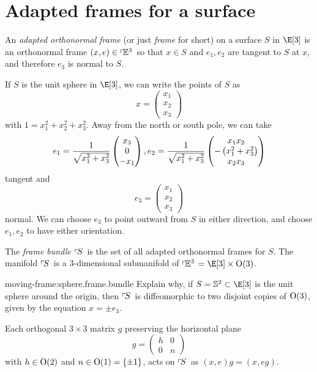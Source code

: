 \section{Adapted frames for a surface}
An \emph{adapted orthonormal frame}%
(or just \emph{frame} for short) on a surface \(S\) in \(\E[3]\) is an orthonormal frame \((x,e) \in \left\ulcorner\!\mathbb{E}^{3}\right.\) so that \(x \in S\) and \(e_1, e_2\) are tangent to \(S\) at \(x\), and therefore \(e_3\) is normal to \(S\).
\begin{example} 
If \(S\) is the unit sphere in \(\E[3]\), we can write the points of \(S\) as
\[
x
=
\begin{pmatrix}
x_1 \\
x_2 \\
x_3
\end{pmatrix}
\]
with \(1=x_1^2+x_2^2+x_3^2\).
Away from the north or south pole, we can take
\[
e_1
=
\frac{1}{\sqrt{x_1^2+x_3^2}}
\begin{pmatrix}
x_3 \\
0 \\
-x_1
\end{pmatrix},
e_2
=
\frac{1}{\sqrt{x_1^2+x_3^2}}
\begin{pmatrix}
x_1 x_2 \\
-\left(x_1^2+x_3^2\right) \\
x_2 x_3
\end{pmatrix}
\]
tangent and 
\[
 e_3=
 \begin{pmatrix}
  x_1 \\
  x_2 \\
  x_3
 \end{pmatrix}
\]
normal.
We can choose \(e_3\) to point outward from \(S\) in either direction, and choose \(e_1, e_2\) to have either orientation.
\end{example}
The \emph{frame bundle}%
\(\left\ulcorner\!S\right.\) is the set of all adapted orthonormal frames for \(S\).
The manifold \(\left\ulcorner\!S\right.\) is a \(3\)-dimensional submanifold of \(\frameBundleE{3}=\E[3] \times \Orth{3}\).
\begin{problem}{moving-frame:sphere.frame.bundle}
Explain why, if \(S=\mathbb{S}^2 \subset \E[3]\) is the unit sphere around the origin, then \(\left\ulcorner\!S\right.\) is diffeomorphic to two disjoint copies of \(\textrm{O}\!\left(3\right)\), given by the equation \(x=\pm e_3\).
\end{problem}
Each orthogonal \(3\times 3\) matrix \(g\) preserving the horizontal plane
\[
 g=\begin{pmatrix}
    h & 0 \\
    0 & n
   \end{pmatrix}
\]
with \(h \in \textrm{O}\!\left(2\right)\) and \(n\in\textrm{O}\!\left(1\right)=\{\pm 1\}\), acts on \(\left\ulcorner\!S\right.\) as \((x,e)g=(x,eg)\).

